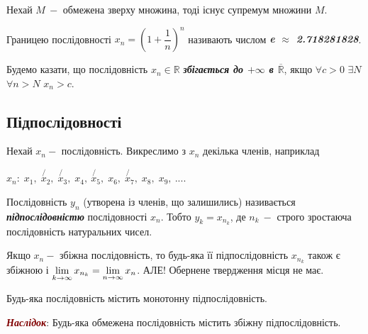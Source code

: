 \begin{theorem}
         Нехай $M \: - $ обмежена зверху множина, тоді існує супремум \newline множини $M$.
\end{theorem}

\begin{definition} 
       Границею послідовності $x_n = \left(1 + \dfrac{1}{n}\right)^{n}$ називають числом \textcolor{NavyBlue}{\textbf{\textit{{e $\approx$ 2.718281828}}}}.
\end{definition}

\begin{definition} 
       Будемо казати, що послідовність $x_n \in \mathbb{R}$ \textcolor{NavyBlue}{\textbf{\textit{{збігається до $+\infty$ в $\mathbb{\overline{R}}$}}}}, якщо \newline $\forall c > 0$  $\exists N$ $\forall n > N$ $x_n > c$.
\end{definition}

\subsection{\large{Підпослідовності}}
\begin{definition} 
       Нехай $x_n - $ послідовність. Викреслимо з $x_n$ декілька членів, наприклад \newline \centerline{$x_n: \; x_1, \; \not{x_2}, \; \not{x_3},\; x_4,\ \not{x_5},\; x_6,\; \not{x_7},\; x_8,\; x_9,\:...$.} Послідовність $y_n$ (утворена із членів, що залишились) називається \textcolor{NavyBlue}{\textbf{\textit{{підпослідовністю}}}} послідовності $x_n$. \newline Тобто $y_k = x_{n_k}$, де $n_k \: - $ строго зростаюча послідовність натуральних чисел. 
\end{definition}

\begin{theorem}[]
         Якщо $x_n - $ збіжна послідовність, то будь-яка її підпослідовність $x_{n_k}$ також є збіжною \newline і $\displaystyle\lim\limits_{k \to \infty} x_{n_k} = \displaystyle\lim\limits_{n \to \infty} x_n$. АЛЕ! Обернене твердження місця не має.
\end{theorem}

\begin{theorem}
         Будь-яка послідовність містить монотонну підпослідовність.
         \item \textcolor{Maroon}{\textbf{\textit{{{Наслідок}}}}}: Будь-яка обмежена послідовність містить збіжну підпослідовність.
\end{theorem}

